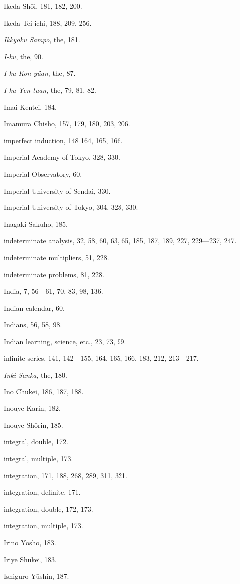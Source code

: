 \documentclass[11pt]{article}
\begin{document}
Ikeda Shōi, 181, 182, 200.\par
Ikeda Tei-ichi, 188, 209, 256.\par
\emph{Ikkyoku Sampō}, the, 181.\par
\emph{I-ku}, the, 90.\par
\emph{I-ku Kon-yüan}, the, 87.\par
\emph{I-ku Yen-tuan}, the, 79, 81, 82.\par
Imai Kentei, 184.\par
Imamura Chishō, 157, 179, 180, 203, 206.\par
imperfect induction, 148 164, 165, 166.\par
Imperial Academy of Tokyo, 328, 330.\par
Imperial Observatory, 60.\par
Imperial University of Sendai, 330.\par
Imperial University of Tokyo, 304, 328, 330.\par
Inagaki Sakuho, 185.\par
indeterminate analysis, 32, 58, 60, 63, 65, 185, 187, 189, 227, 229—237, 247.\par
indeterminate multipliers, 51, 228.\par
indeterminate problems, 81, 228.\par
India, 7, 56—61, 70, 83, 98, 136.\par
Indian calendar, 60.\par
Indians, 56, 58, 98.\par
Indian learning, science, etc., 23, 73, 99.\par
infinite series, 141, 142—155, 164, 165, 166, 183, 212, 213—217.\par
\emph{Inki Sanka}, the, 180.\par
Inō Chūkei, 186, 187, 188.\par
Inouye Karin, 182.\par
Inouye Shōrin, 185.\par
integral, double, 172.\par
integral, multiple, 173.\par
integration, 171, 188, 268, 289, 311, 321.\par
integration, definite, 171.\par
integration, double, 172, 173.\par
integration, multiple, 173.\par
Irino Yōshō, 183.\par
Iriye Shūkei, 183.\par
Ishiguro Yūshin, 187.\par
\end{document}

